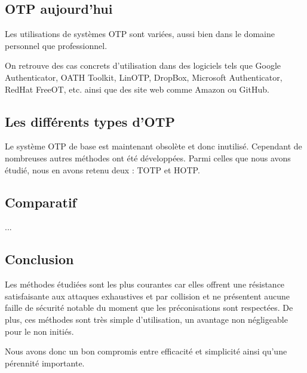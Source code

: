 \subsection{OTP aujourd'hui}
	
	Les utilisations de systèmes OTP sont variées, aussi bien dans le domaine 
	personnel que professionnel.
	
	On retrouve des cas concrets d'utilisation dans des logiciels tels que Google 
	Authenticator, OATH Toolkit, LinOTP, DropBox, Microsoft Authenticator, RedHat 
	FreeOT, etc. ainsi que des site web comme Amazon ou GitHub.

\subsection{Les différents types d'OTP}

	Le système OTP de base est maintenant obsolète et donc inutilisé. Cependant de
	nombreuses autres méthodes ont été développées. Parmi celles que nous avons 
	étudié, nous en avons retenu deux : TOTP et HOTP.

\subsection{Comparatif}

	...

\subsection{Conclusion}

	Les méthodes étudiées sont les plus courantes car elles offrent une résistance
	satisfaisante aux attaques exhaustives et par collision et ne présentent 
	aucune faille de sécurité notable du moment que les préconisations sont 
	respectées. De plus, ces méthodes sont très simple d'utilisation, un avantage
	non négligeable pour le non initiés. 
	
	Nous avons donc un bon compromis entre efficacité et simplicité ainsi qu'une 
	pérennité importante.